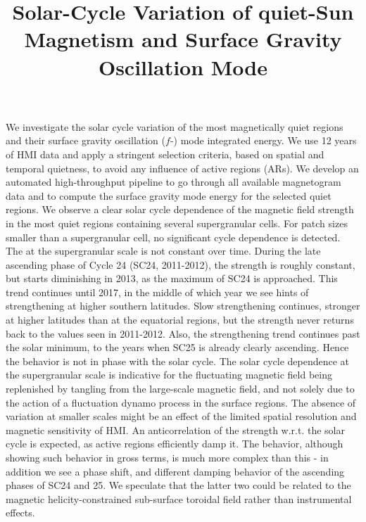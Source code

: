 \documentclass{aa}
\begin{document}
\title{Solar-Cycle Variation of quiet-Sun Magnetism and Surface Gravity Oscillation Mode}



{We investigate the solar cycle variation of the most magnetically quiet regions and
their surface gravity oscillation ($f$-) mode integrated 
energy.
}
{We use 12 years of HMI data and apply a stringent selection criteria, based on
spatial and temporal quietness, to avoid any influence of active regions (ARs).
We develop an automated high-throughput pipeline to go through all available magnetogram data
and to compute the surface gravity mode 
energy
for the selected quiet regions.}
{We observe a clear solar cycle dependence of the magnetic field strength in the most
quiet regions containing several supergranular cells. For patch sizes smaller than a supergranular
cell, no significant cycle dependence is detected. The \fff at the supergranular scale 
is not constant over time.
During the late ascending phase of Cycle 24 (SC24, 2011-2012), the \fff strength is roughly constant, but starts diminishing in 2013, as the maximum of SC24 is approached. This trend continues
until 2017, in the middle of which year we see hints of strengthening at higher southern latitudes.
Slow strengthening continues, stronger at higher latitudes than at the equatorial regions, but the \fff strength never returns back to the values seen in 2011-2012. Also, the strengthening trend continues past the solar minimum, to the years when SC25 is already clearly ascending. Hence the \fff behavior is not in phase with the solar cycle. 
}
{The solar cycle dependence at the supergranular scale is indicative for the fluctuating magnetic
field being replenished by tangling from the large-scale magnetic field, and not solely due to
the action of a fluctuation dynamo process in the surface regions. 
The absence of variation at smaller scales might be an effect of the
limited spatial resolution and magnetic sensitivity of HMI.
An anticorrelation of the \fff strength w.r.t. the solar cycle is expected, as active regions efficiently damp it. The \fff behavior, although showing such behavior in gross terms, is much more complex than this - in addition we see a phase shift, and different damping behavior of the ascending phases of SC24 and 25. We speculate that the latter two could be related to the magnetic helicity-constrained sub-surface toroidal field rather than instrumental effects. 
}
\end{document}
